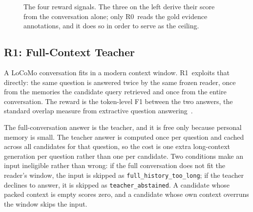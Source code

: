 \documentclass[12pt,letterpaper,oneside]{report}
\newcommand{\code}[1]{\texttt{\small #1}}
\newcommand{\Rz}{R0}
\newcommand{\Ra}{R1}
\begin{document}
\begin{figure}[htbp]
\begin{singlespace}
\end{singlespace}
\caption[The four reward signals]{The four reward signals. The three on the left derive their score
from the conversation alone; only \Rz\ reads the gold evidence annotations,
and it does so in order to serve as the ceiling.}
\label{fig:rewards}
\end{figure}

\subsection{\Ra: Full-Context Teacher}

A LoCoMo conversation fits in a modern context window. \Ra\ exploits that
directly: the same question is answered twice by the same frozen reader, once
from the memories the candidate query retrieved and once from the entire
conversation. The reward is the token-level F1 between the two answers, the
standard overlap measure from extractive question answering~\cite{squad}.

The full-conversation answer is the teacher, and it is free only because
personal memory is small. The teacher answer is computed once per question and
cached across all candidates for that question, so the cost is one extra
long-context generation per question rather than one per candidate. Two
conditions make an input ineligible rather than wrong: if the full conversation
does not fit the reader's window, the input is skipped as
\code{full\_history\_too\_long}; if the teacher declines to answer, it is
skipped as \code{teacher\_abstained}. A candidate whose packed context is empty
scores zero, and a candidate whose own context overruns the window skips the
input.
\end{document}
